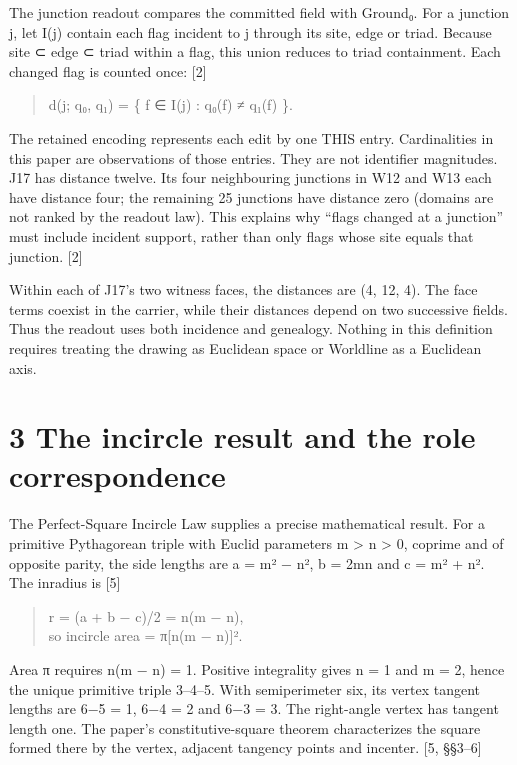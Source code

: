 \documentclass[
]{article}
\begin{document}
The junction readout compares the committed field with Ground₀. For a
junction j, let I(j) contain each flag incident to j through its site,
edge or triad. Because site ⊂ edge ⊂ triad within a flag, this union
reduces to triad containment. Each changed flag is counted once: {[}2{]}

\begin{quote}
d(j; q₀, q₁) = \textbar\{ f ∈ I(j) : q₀(f) ≠ q₁(f) \}\textbar.
\end{quote}

The retained encoding represents each edit by one THIS entry.
Cardinalities in this paper are observations of those entries. They are
not identifier magnitudes. J17 has distance twelve. Its four
neighbouring junctions in W12 and W13 each have distance four; the
remaining 25 junctions have distance zero (domains are not ranked by the
readout law). This explains why ``flags changed at a junction'' must
include incident support, rather than only flags whose site equals that
junction. {[}2{]}

Within each of J17's two witness faces, the distances are (4, 12, 4).
The face terms coexist in the carrier, while their distances depend on
two successive fields. Thus the readout uses both incidence and
genealogy. Nothing in this definition requires treating the drawing as
Euclidean space or Worldline as a Euclidean axis.

\section{3 The incircle result and the role
correspondence}\label{the-incircle-result-and-the-role-correspondence}

The Perfect-Square Incircle Law supplies a precise mathematical result.
For a primitive Pythagorean triple with Euclid parameters m
\textgreater{} n \textgreater{} 0, coprime and of opposite parity, the
side lengths are a = m² − n², b = 2mn and c = m² + n². The inradius is
{[}5{]}

\begin{quote}
r = (a + b − c)/2 = n(m − n),\\
so incircle area = π{[}n(m − n){]}².
\end{quote}

Area π requires n(m − n) = 1. Positive integrality gives n = 1 and m =
2, hence the unique primitive triple 3--4--5. With semiperimeter six,
its vertex tangent lengths are 6−5 = 1, 6−4 = 2 and 6−3 = 3. The
right-angle vertex has tangent length one. The paper's
constitutive-square theorem characterizes the square formed there by the
vertex, adjacent tangency points and incenter. {[}5, §§3--6{]}
\end{document}
